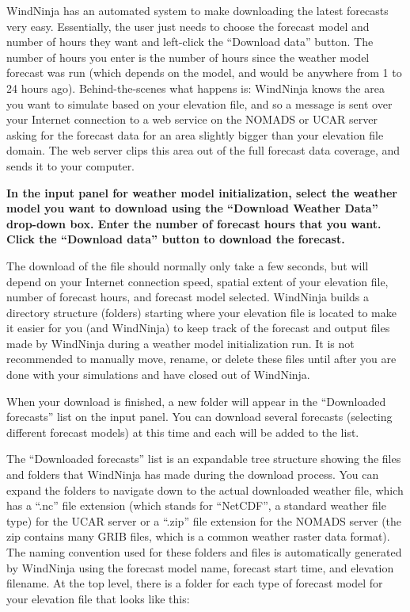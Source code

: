 \documentclass[12pt]{article}
\begin{document}
WindNinja has an automated system to make downloading the latest forecasts very easy.  
Essentially, the user just needs to choose the forecast model and number of hours they want and left-click the “Download data” button.  
The number of hours you enter is the number of hours since the weather model forecast was run (which depends on the model, and would be anywhere from 1 to 24 hours ago).  
Behind-the-scenes what happens is: WindNinja knows the area you want to simulate based on your elevation file, and so a message is sent over your Internet connection to a web service on the NOMADS or UCAR server asking for the forecast data for an area slightly bigger than your elevation file domain.  
The web server clips this area out of the full forecast data coverage, and sends it to your computer.

\textbf{\color{red} In the input panel for weather model initialization, select the weather model you want to download using the “Download Weather Data” drop-down box.  
Enter the number of forecast hours that you want.  Click the “Download data” button to download the forecast.}

The download of the file should normally only take a few seconds, but will depend on your Internet connection speed, spatial extent of your elevation file, number of forecast hours, and forecast model selected.  
WindNinja builds a directory structure (folders) starting where your elevation file is located to make it easier for you (and WindNinja) to keep track of the forecast and output files made by WindNinja during a weather model initialization run.  
It is not recommended to manually move, rename, or delete these files until after you are done with your simulations and have closed out of WindNinja.

When your download is finished, a new folder will appear in the “Downloaded forecasts” list on the input panel.  
You can download several forecasts (selecting different forecast models) at this time and each will be added to the list.

The “Downloaded forecasts” list is an expandable tree structure showing the files and folders that WindNinja has made during the download process.  
You can expand the folders to navigate down to the actual downloaded weather file, which has a “.nc” file extension (which stands for “NetCDF”, a standard weather file type) for the UCAR server or a “.zip” file extension for the NOMADS server (the zip contains many GRIB files, which is a common weather raster data format).  
The naming convention used for these folders and files is automatically generated by WindNinja using the forecast model name, forecast start time, and elevation filename.  
At the top level, there is a folder for each type of forecast model for your elevation file that looks like this:
\end{document}
